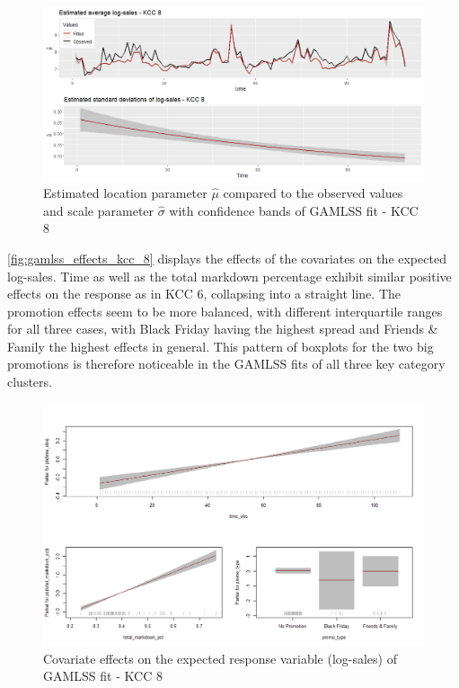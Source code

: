 \begin{figure}[H]
\centering
  \includegraphics[width=0.95\linewidth]{figures/gamlss_kcc_8_estimated_parameters.png}
  \caption{Estimated location parameter $\hat{\mu}$ compared to the observed values and scale parameter $\hat{\sigma}$ with confidence bands of GAMLSS fit - KCC 8}
  \label{fig:gamlss_kcc_8_estimated_parameters}
\end{figure}


\autoref{fig:gamlss_effects_kcc_8} displays the effects of the covariates on the expected log-sales.
Time as well as the total markdown percentage exhibit similar positive effects on the response as in \ac{KCC} 6, collapsing into a straight line. The promotion effects seem to be more balanced, with different interquartile ranges for all three cases, with Black Friday having the highest spread and Friends \& Family the highest effects in general. This pattern of boxplots for the two big promotions is therefore noticeable in the \ac{GAMLSS} fits of all three key category clusters. 
\\


\begin{figure}[H]
\centering
  \includegraphics[width=0.95\linewidth]{figures/gamlss_effects_kcc_8.png}
  \caption{Covariate effects on the expected response variable (log-sales) of GAMLSS fit - KCC 8}
  \label{fig:gamlss_effects_kcc_8}
\end{figure}


